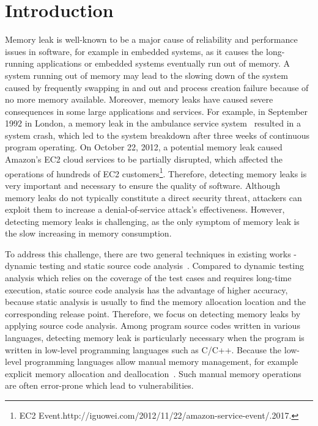 \section{Introduction}\label{sec:intro}
Memory leak is well-known to be a major cause of reliability and performance issues in software, for example in embedded systems, as it causes the long-running applications or embedded systems eventually run out of memory. 
A system running out of memory may lead to the slowing down of the system caused by frequently swapping in and out and process creation failure because of no more memory available. Moreover, memory leaks have caused severe consequences in some large applications and services. For example, in September 1992 in London, a memory leak in the ambulance service system~\cite{F93} resulted in a system crash, which led to the system breakdown after three weeks of continuous program operating. On October 22, 2012, a potential memory leak caused Amazon's EC2 cloud services to be partially disrupted, which affected the operations of hundreds of EC2 customers\footnote{EC2 Event.http://iguowei.com/2012/11/22/amazon-service-event/.2017.}. 
Therefore, detecting memory leaks is very important and necessary to ensure the quality of software. Although memory leaks do not typically constitute a direct security threat, attackers can exploit them to increase a denial-of-service attack’s effectiveness.
However, detecting memory leaks is challenging, as the only symptom of memory leak is the slow increasing in memory consumption.  

To address this challenge, there are two general techniques in existing works - dynamic testing and static source code analysis~\cite{AJ06}. 
Compared to dynamic testing analysis which relies on the coverage of the test cases and requires long-time execution, static source code analysis has the advantage of higher accuracy, because static analysis is usually to find the memory allocation location and the corresponding release point.
Therefore, we focus on detecting memory leaks by applying source code analysis.
Among program source codes written in various languages, detecting memory leak is particularly necessary when the program is written in low-level programming languages such as C/C++. Because the low-level programming languages allow manual memory management, for example explicit memory allocation and deallocation~\cite{KJMP06}. Such manual memory operations are often error-prone which lead to vulnerabilities. 

